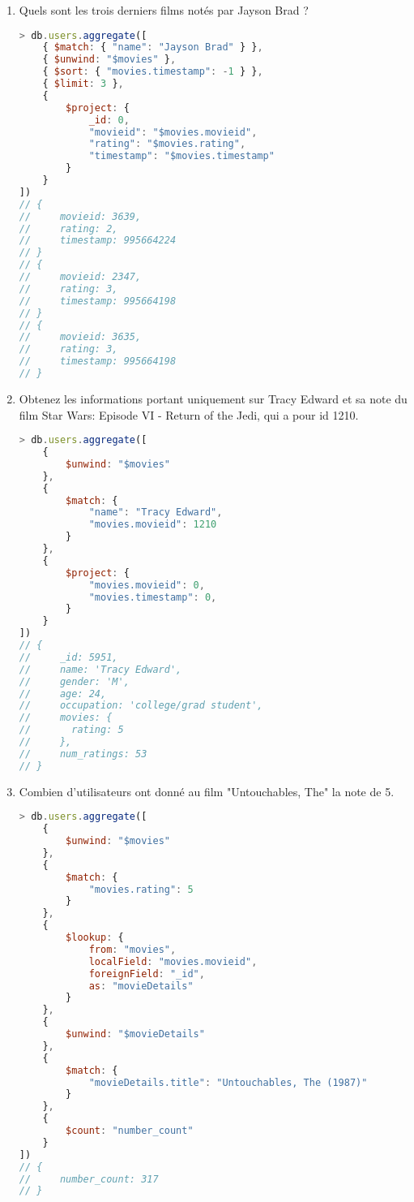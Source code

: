 \documentclass{article}
\begin{document}
\begin{enumerate}
\item Quels sont les trois derniers films notés par Jayson Brad ?
\begin{lstlisting}[language=JavaScript]
> db.users.aggregate([
    { $match: { "name": "Jayson Brad" } },
    { $unwind: "$movies" },
    { $sort: { "movies.timestamp": -1 } },
    { $limit: 3 },
    { 
        $project: { 
            _id: 0, 
            "movieid": "$movies.movieid", 
            "rating": "$movies.rating", 
            "timestamp": "$movies.timestamp" 
        }
    }
])
// {
//     movieid: 3639,
//     rating: 2,
//     timestamp: 995664224
// }
// {
//     movieid: 2347,
//     rating: 3,
//     timestamp: 995664198
// }
// {
//     movieid: 3635,
//     rating: 3,
//     timestamp: 995664198
// }
\end{lstlisting}

\item Obtenez les informations portant uniquement sur Tracy Edward et sa note du film Star Wars: Episode VI - Return of the Jedi, qui a pour id 1210.
\begin{lstlisting}[language=JavaScript]
> db.users.aggregate([
    {
        $unwind: "$movies"
    },
    {
        $match: {
            "name": "Tracy Edward", 
            "movies.movieid": 1210
        }
    },
    {
        $project: {
            "movies.movieid": 0,
            "movies.timestamp": 0,
        }
    }
])
// {
//     _id: 5951,
//     name: 'Tracy Edward',
//     gender: 'M',
//     age: 24,
//     occupation: 'college/grad student',
//     movies: {
//       rating: 5
//     },
//     num_ratings: 53
// }
\end{lstlisting}

\item Combien d'utilisateurs ont donné au film "Untouchables, The" la note de 5.
\begin{lstlisting}[language=JavaScript]
> db.users.aggregate([
    {
        $unwind: "$movies"
    },
    {
        $match: {
            "movies.rating": 5
        }
    },
    {
        $lookup: {
            from: "movies",
            localField: "movies.movieid",
            foreignField: "_id",
            as: "movieDetails"
        }
    },
    {
        $unwind: "$movieDetails"
    },
    {
        $match: {
            "movieDetails.title": "Untouchables, The (1987)"
        }
    },
    {
        $count: "number_count"
    }
])
// {
//     number_count: 317
// }
\end{lstlisting}

\end{enumerate}
\end{document}
